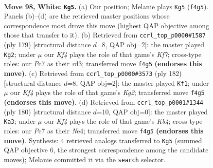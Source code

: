 \documentclass[11pt]{article}
\begin{document}
\clearpage

\begin{figure}[p]\centering
\begin{subfigure}{0.46\textwidth}\centering
\resizebox{\linewidth}{!}{%
\newchessgame
\chessboard[
  setfen={6k1/2P5/8/8/5K2/6B1/8/8 w - - 21 98},
  showmover=false,
  pgfstyle=straightmove, color=movearrow, markmove={f4-g5}
]}
\caption{}
\end{subfigure}\hfill
\begin{subfigure}{0.46\textwidth}\centering
\resizebox{\linewidth}{!}{%
\newchessgame
\chessboard[
  setfen={8/8/8/8/8/3R2b1/5k2/1K6 b - - 32 90},
  showmover=false,
  pgfstyle=straightmove, color=movearrow, markmove={f2-g2}
]}
\caption{}
\end{subfigure}
\\[4pt]
\begin{subfigure}{0.46\textwidth}\centering
\resizebox{\linewidth}{!}{%
\newchessgame
\chessboard[
  setfen={8/8/8/8/k7/6p1/6K1/7B w - - 12 92},
  showmover=false,
  pgfstyle=straightmove, color=movearrow, markmove={g2-f1}
]}
\caption{}
\end{subfigure}\hfill
\begin{subfigure}{0.46\textwidth}\centering
\resizebox{\linewidth}{!}{%
\newchessgame
\chessboard[
  setfen={8/8/8/8/1K2N3/8/4B3/k7 w - - 8 91},
  showmover=false,
  pgfstyle=straightmove, color=movearrow, markmove={b4-a3}
]}
\caption{}
\end{subfigure}
\caption{\textbf{Move 98, White: \texttt{Kg5}.} (a) Our position; Melanie plays \texttt{Kg5} (\texttt{f4g5}). Panels (b)--(d) are the retrieved master positions whose correspondence most drove this move (highest QAP objective among those that transfer to it). (b) Retrieved from \texttt{ccrl\_top\_p0000\#1587} (ply 179) [structural distance $d$=8, QAP obj=2]: the master played \texttt{Kg2}; under $\mu$ our \emph{Kf4} plays the role of that game's \emph{Kf7}; cross-type roles: our \emph{P}c7 as their \emph{r}d3; transferred move \texttt{f4g5} \textbf{(endorses this move)}. (c) Retrieved from \texttt{ccrl\_top\_p0000\#3573} (ply 182) [structural distance $d$=8, QAP obj=2]: the master played \texttt{Kf1}; under $\mu$ our \emph{Kf4} plays the role of that game's \emph{Kg2}; transferred move \texttt{f4g5} \textbf{(endorses this move)}. (d) Retrieved from \texttt{ccrl\_top\_p0001\#1344} (ply 180) [structural distance $d$=10, QAP obj=0]: the master played \texttt{Ka3}; under $\mu$ our \emph{Kf4} plays the role of that game's \emph{Kb4}; cross-type roles: our \emph{P}c7 as their \emph{N}e4; transferred move \texttt{f4g5} \textbf{(endorses this move)}. Synthesis: 4 retrieved analogs transferred to \texttt{Kg5} (summed QAP objective 6, the strongest correspondence among the candidate moves); Melanie committed it via the \texttt{search} selector.}
\label{fig:thought-m194}
\end{figure}
\end{document}
